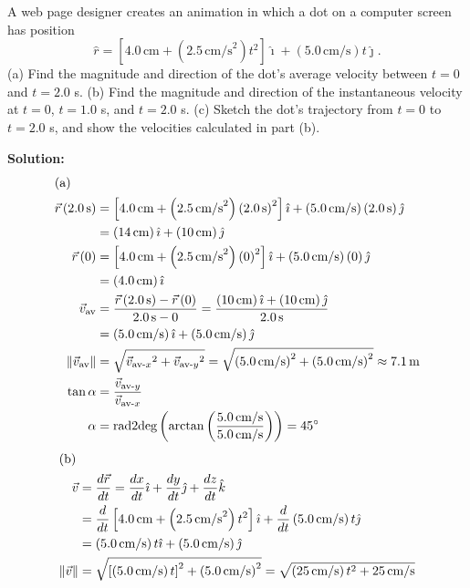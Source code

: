 \documentclass[12pt]{article}
\newenvironment{problem}[2][]{
    \begin{trivlist}
        \item[
            {\bfseries #1}
            {\bfseries #2}
        ]
}{\end{trivlist}}
\newcommand{\solution}{\medskip\noindent\textbf{Solution:}}
\newcommand{\Part}[1]{\shortintertext{(#1)}}
\newcommand{\magnitude}[1]{\lVert #1 \rVert}
\newcommand{\UVector}[2]{\left(#1\right)\ihat + \left(#2\right)\jhat}
\newcommand{\ihat}{\hat{\imath}}
\newcommand{\jhat}{\hat{\jmath}}
\newcommand{\radtodeg}[1]{\mbox{rad2deg}\left(#1\right)}
\newcommand{\unit}[1]{\, \text{#1}}
\newcommand{\cm}{\unit{cm}}
\newcommand{\m}{\unit{m}}
\newcommand{\cms}{\unit{cm/s}}
\newcommand{\s}{\unit{s}}
\begin{document}
\begin{problem}{3.3}
    A web page designer creates an animation in which a dot on a computer screen has position
    $$\hat{r} = \left[4.0 \cm + \left(2.5 \cms^2\right) t^2\right] \ihat + \left(5.0 \cms\right) t \jhat.$$
    (a) Find the magnitude and direction of the dot's average velocity between $t = 0$ and $t = 2.0$ s.
    (b) Find the magnitude and direction of the instantaneous velocity at $t = 0$, $t = 1.0$ s, and $t = 2.0$ s.
    (c) Sketch the dot's trajectory from $t = 0$ to $t = 2.0$ s, and show the velocities calculated in part (b).

    \solution
    \begin{align}
        \Part{a}
        \vec{r} \left(2.0 \s\right) &= \left[4.0 \cm + \left(2.5 \cms^2\right) \left(2.0 \s\right)^2\right] \ihat + \left(5.0 \cms\right) \left(2.0 \s\right) \jhat \\
        &= \left(14 \cm\right) \ihat + \left(10 \cm\right) \jhat \\
        \vec{r} \left(0\right) &= \left[4.0 \cm + \left(2.5 \cms^2\right) \left(0\right)^2\right] \ihat + \left(5.0 \cms\right) \left(0\right) \jhat \\
        &= \left(4.0 \cm\right) \ihat \\
        \vec{v}_{\text{av}} &= \frac{\vec{r} \left(2.0 \s\right) - \vec{r} \left(0\right)}{2.0 \s - 0} = \frac{\UVector{10 \cm}{10 \cm}}{2.0 \s} \\
        &= \UVector{5.0 \cms}{5.0 \cms} \\
        \magnitude{\vec{v}_{\text{av}}} &= \sqrt{{\vec{v}_{\text{av-}x}}\phantom{}^2 + {\vec{v}_{\text{av-}y}}\phantom{}^2} = \sqrt{\left(5.0 \cms\right)^2 + \left(5.0 \cms\right)^2} \approx 7.1 \m \\
        \tan \alpha &= \frac{\vec{v}_{\text{av-}y}}{\vec{v}_{\text{av-}x}} \\
        \alpha &= \radtodeg{\arctan{\left(\frac{5.0 \cms}{5.0 \cms}\right)}} = 45^\circ 
    \end{align}
    \begin{align}
        \Part{b}
        \vec{v} &= \frac{d\vec{r}}{dt} = \frac{dx}{dt} \ihat + \frac{dy}{dt} \jhat + \frac{dz}{dt} \hat{k} \\
        &= \frac{d}{dt} \left[4.0 \cm + \left(2.5 \cms^2\right) t^2\right] \ihat + \frac{d}{dt} \left(5.0 \cms\right) t \jhat \\
        &= \left(5.0 \cms\right) t \ihat + \left(5.0 \cms\right) \jhat \\
        \magnitude{\vec{v}} &= \sqrt{\left[\left(5.0 \cms\right) t\right]^2 + \left(5.0 \cms\right)^2} = \sqrt{\left(25 \cms\right) t^2 + 25 \cms} \\

\end{align}
\end{problem}
\end{document}
